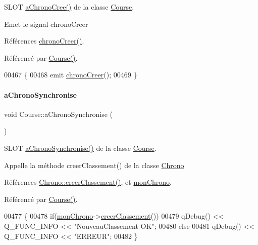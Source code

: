 S\+L\+OT \hyperlink{class_course_ada484058a0180a31a98ee77c4fad93f8}{a\+Chrono\+Cree()} de la classe \hyperlink{class_course}{Course}. 

Emet le signal chrono\+Creer 

Références \hyperlink{class_course_a1c7830a51af59f70998ff0576f0aa7cd}{chrono\+Creer()}.



Référencé par \hyperlink{class_course_af6317ecab95f8a2eb205b4f91b530992}{Course()}.


\begin{DoxyCode}
00467 \{
00468     emit \hyperlink{class_course_a1c7830a51af59f70998ff0576f0aa7cd}{chronoCreer}();
00469 \}
\end{DoxyCode}
\mbox{\label{class_course_a90c66d620f0726d92c40069f052e0cd0}} 
\paragraph{\texorpdfstring{a\+Chrono\+Synchronise}{aChronoSynchronise}}
{\footnotesize\ttfamily void Course\+::a\+Chrono\+Synchronise (\begin{DoxyParamCaption}{ }\end{DoxyParamCaption})\hspace{0.3cm}{\ttfamily [slot]}}



S\+L\+OT \hyperlink{class_course_a90c66d620f0726d92c40069f052e0cd0}{a\+Chrono\+Synchronise()} de la classe \hyperlink{class_course}{Course}. 

Appelle la méthode creer\+Classement() de la classe \hyperlink{class_chrono}{Chrono} 

Références \hyperlink{class_chrono_a0d7e3e50fcef0f2b0b7bfadc3d4f737d}{Chrono\+::creer\+Classement()}, et \hyperlink{class_course_a0c9b246b0f1ec612bd6e6c613a94d52b}{mon\+Chrono}.



Référencé par \hyperlink{class_course_af6317ecab95f8a2eb205b4f91b530992}{Course()}.


\begin{DoxyCode}
00477 \{
00478     \textcolor{keywordflow}{if}(\hyperlink{class_course_a0c9b246b0f1ec612bd6e6c613a94d52b}{monChrono}->\hyperlink{class_chrono_a0d7e3e50fcef0f2b0b7bfadc3d4f737d}{creerClassement}())
00479         qDebug() << Q\_FUNC\_INFO << \textcolor{stringliteral}{"NouveauClassement OK"};
00480     \textcolor{keywordflow}{else}
00481         qDebug() << Q\_FUNC\_INFO << \textcolor{stringliteral}{"ERREUR"};
00482 \}
\end{DoxyCode}
\mbox{\label{class_course_a43696137587262b721767f6113621772}} 
